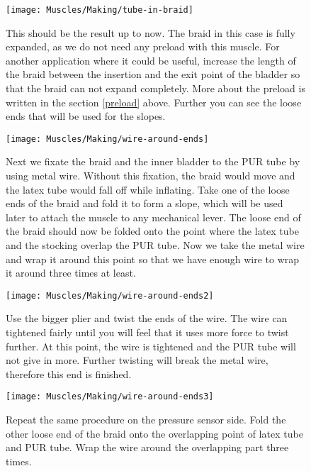 \documentclass[main]{subfiles}
\begin{document}
\begin{figure}[H]
\centering
\texttt{[image: Muscles/Making/tube-in-braid]}
\caption[Bladder in braid]{This should be the result up to now. The braid in this case is fully expanded, as we do not need any preload with this muscle. For another application where it could be useful, increase the length of the braid between the insertion and the exit point of the bladder so that the braid can not expand completely. More about the preload is written in the section \ref{preload} above. Further you can see the loose ends that will be used for the slopes.}
\label{tube-in-braid}
\end{figure}

\begin{figure}[H]
\centering
\texttt{[image: Muscles/Making/wire-around-ends]}
\caption[Fixation of the braid and the bladder]{Next we fixate the braid and the inner bladder to the PUR tube by using metal wire. Without this fixation, the braid would move and the latex tube would fall off while inflating. Take one of the loose ends of the braid and fold it to form a slope, which will be used later to attach the muscle to any mechanical lever. The loose end of the braid should now be folded onto the point where the latex tube and the stocking overlap the PUR tube. Now we take the metal wire and wrap it around this point so that we have enough wire to wrap it around three times at least.}
\label{wire-around-ends}
\end{figure}

\begin{figure}[H]
\centering
\texttt{[image: Muscles/Making/wire-around-ends2]}
\caption[Tightening of the fixation]{Use the bigger plier and twist the ends of the wire. The wire can tightened fairly until you will feel that it uses more force to twist further. At this point, the wire is tightened and the PUR tube will not give in more. Further twisting will break the metal wire, therefore this end is finished.}
\label{wire-around-end2}
\end{figure}

\begin{figure}[H]
\centering
\texttt{[image: Muscles/Making/wire-around-ends3]}
\caption[Fixation on the other side]{Repeat the same procedure on the pressure sensor side. Fold the other loose end of the braid onto the overlapping point of latex tube and PUR tube. Wrap the wire around the overlapping part three times.}
\label{wire-around-end3}
\end{figure}
\end{document}
